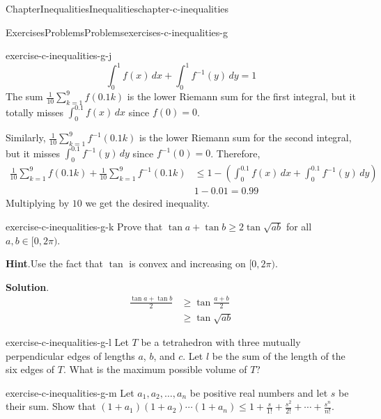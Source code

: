 \documentclass[oneside,10pt,]{book}
\newcommand{\blocktitlefont}{\relax}
\numberwithin{equation}{section}
\begin{document}
\begin{chapterptx}{Chapter}{Inequalities}{}{Inequalities}{}{}{chapter-c-inequalities}
\begin{exercises-section}{Exercises}{Problems}{}{Problems}{}{}{exercises-c-inequalities-g}
\begin{divisionexercise}{9}{}{}{exercise-c-inequalities-g-j}
\begin{equation*}
\int_0^1 f(x)\,dx + \int_0^1 f^{-1}(y)\,dy = 1
\end{equation*}
The sum \(\frac{1}{10}\sum_{k=1}^9 f(0.1k)\) is the lower Riemann sum for the first integral, but it totally misses \(\int_0^{0.1} f(x)\,dx\) since \(f(0)=0\).%
\par
Similarly, \(\frac{1}{10}\sum_{k=1}^9 f^{-1}(0.1k)\) is the lower Riemann sum for the second integral, but it misses \(\int_0^{0.1} f^{-1}(y)\,dy\) since \(f^{-1}(0)=0\).  Therefore,%
\begin{equation*}
\begin{split}
\frac{1}{10}\sum_{k=1}^9 f(0.1k)+ \frac{1}{10}\sum_{k=1}^9 f^{-1}(0.1k) &\leq 
1-\left(\int_0^{0.1} f(x)\,dx + \int_0^{0.1} f^{-1}(y)\,dy  \right)\\
& 1-0.01 = 0.99
\end{split}
\end{equation*}
Multiplying by \(10\) we get the desired inequality.%
\end{divisionexercise}%
\begin{divisionexercise}{10}{}{}{exercise-c-inequalities-g-k}%
Prove that \(\tan{a} + \tan{b} \geq 2 \tan{\sqrt{a b}}\) for all \(a, b \in [0,2 \pi)\).%
\par\smallskip%
\noindent\textbf{\blocktitlefont Hint}.\hypertarget{hint-c-inequalities-g-k-b}{}\quad{}Use the fact that \(\tan\) is convex and increasing on \([0,2 \pi)\).%
\par\smallskip%
\noindent\textbf{\blocktitlefont Solution}.\hypertarget{solution-c-inequalities-g-k-c}{}\quad{}%
\begin{equation*}
\begin{split}
\frac{\tan{a} + \tan{b}}{2} & \geq \tan{\frac{a + b}{2}}\\
& \geq   \tan{\sqrt{a b}}
\end{split}
\end{equation*}
%
\end{divisionexercise}%
\begin{divisionexercise}{11}{}{}{exercise-c-inequalities-g-l}%
Let \(T\) be a tetrahedron with three mutually perpendicular edges of lengths \(a\), \(b\), and \(c\).  Let \(l\) be the sum of the length of the six edges of \(T\).  What is the maximum possible volume of \(T\)?%
\end{divisionexercise}%
\begin{divisionexercise}{12}{}{}{exercise-c-inequalities-g-m}%
Let \(a_1, a_2, \ldots  , a_n\) be positive real numbers and let \(s\) be their sum.  Show that \(\left(1+a_1\right)\left(1+a_2\right)\cdots \left(1+a_n\right) \leq  1 + \frac{s}{1!}+ \frac{s^2}{2!}+ \cdots +\frac{s^n}{n!}\).%

\end{divisionexercise}
\end{exercises-section}
\end{chapterptx}
\end{document}
